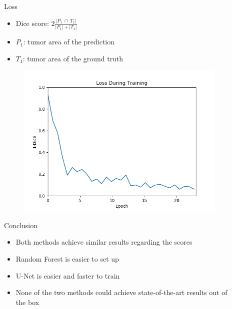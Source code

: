 \documentclass[final]{beamer}
\newlength{\sepwid}
\newlength{\onecolwid}
\newlength{\twocolwid}
\begin{document}
\begin{frame}[t]
\begin{columns}[t]
\begin{column}{\twocolwid}
\begin{columns}[t,totalwidth=\twocolwid]
\begin{column}{\onecolwid}
\end{column} %

\end{columns} %

\end{column} %

\begin{column}{\sepwid}\end{column} %

\begin{column}{\onecolwid} %


\begin{block}{Loss}
\begin{itemize}[label={}]
\item Dice score: $2\frac{|P_1  \ \cap  \ T_1|}{|P_1| + |T_1|}$
\item $P_1$: tumor area of the prediction
\item $T_1$: tumor area of the ground truth
\end{itemize}

\begin{figure}
\includegraphics[width=0.77\linewidth]{trainingloss}
\end{figure}

\end{block}

\begin{block}{Conclusion}
\begin{itemize}[label={}]
\item Both methods achieve similar results regarding the scores
\item Random Forest is easier to set up
\item U-Net is easier and faster to train
\item None of the two methods could achieve state-of-the-art results out of the box
\end{itemize}
\end{block}


\end{column}
\end{columns}
\end{frame}
\end{document}
